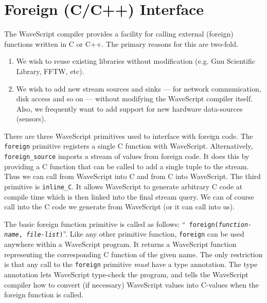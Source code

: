 
\chapter{Foreign (C/C++) Interface}

The WaveScript compiler provides a facility for calling external
(foreign) functions written in C or C++.  The primary reasons for this
are two-fold.

\begin{enumerate}
\item We wish to reuse existing libraries without modification (e.g. Gnu
  Scientific Library, FFTW, etc).

\item We wish to add new stream sources and sinks --- for network communication, disk access and so
  on --- without modifying the WaveScript compiler itself.  Also, we
  frequently want to add support for new hardware data-sources
  (sensors).
  
\end{enumerate}

There are three WaveScript primitives used to interface with foreign
code.  The {\tt foreign} primitive registers a single C function with
WaveScript.  Alternatively, {\tt foreign\_source} imports a stream of
values from foreign code.  It does this by providing a C function that
can be called to add a single tuple to the stream.  Thus we can call
from WaveScript into C and from C into WaveScript.  The third
primitive is {\tt inline\_C}.  It allows WaveScript to generate
arbitrary C code at compile time which is then linked into the final
stream query.  We can of course call into the C code we generate from
WaveScript (or it can call into us).

The basic foreign function primitive is called as follows: ``{\tt
foreign({\em function-name}, {\em file-list})}''.  Like any other
primitive function, {\tt foreign} can be used anywhere within a
WaveScript program.  It returns a WaveScript function representing the
corresponding C function of the given name.  The only restriction is
that any call to the {\tt foreign} primitive {\em must} have a type
annotation.  The type annotation lets WaveScript type-check the
program, and tells the WaveScript compiler how to convert (if
necessary) WaveScript values into C-values when the foreign function
is called.  

